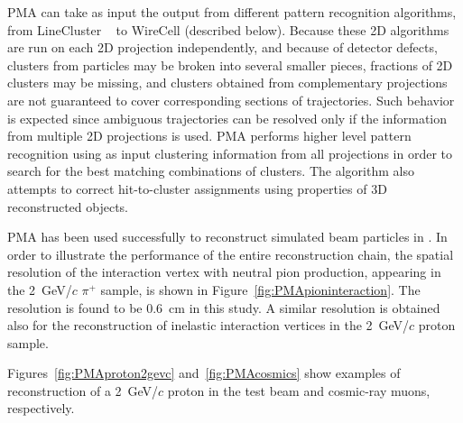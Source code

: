 PMA can take as input the output from different pattern recognition algorithms, from
LineCluster ~\cite{linecluster} to WireCell (described below).  Because these 2D algorithms
are run on each 2D projection independently, and because of detector defects,
clusters from  particles may be broken
into several smaller pieces, fractions of 2D clusters may be missing,
and clusters obtained from complementary projections are not guaranteed to cover corresponding
sections of trajectories. Such behavior is expected since ambiguous 
trajectories can be resolved only if the information from multiple 2D projections is used.
PMA performs higher level pattern recognition using as input clustering information from all
projections in order to search for the best matching combinations of clusters. The algorithm
also attempts to correct hit-to-cluster assignments using properties of 3D reconstructed objects.

PMA has been used successfully to reconstruct simulated beam particles in
\pdsp. In order to illustrate the performance of the entire reconstruction chain,
the spatial resolution of the interaction vertex with neutral pion
production, appearing in the 2~GeV/$c$ $\pi^+$ sample, is shown in Figure~\ref{fig:PMApioninteraction}.
The resolution is found to be 0.6~cm in this study.
A similar resolution is obtained also for the reconstruction
of inelastic interaction vertices in the 2~GeV/$c$ proton sample. 


Figures~\ref{fig:PMAproton2gevc}
and~\ref{fig:PMAcosmics} show examples of reconstruction of a 2~GeV/$c$ proton in the test beam and
cosmic-ray muons, respectively.

